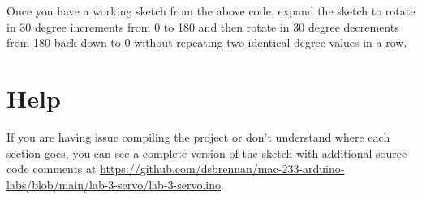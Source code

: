 \documentclass[11pt,a4paper]{article}
\begin{document}
\noindent
Once you have a working sketch from the above code, expand the sketch to rotate in 30 degree increments from 0 to 180 and then rotate in 30 degree decrements from 180 back down to 0 without repeating two identical degree values in a row.

\section*{Help}
If you are having issue compiling the project or don't understand where each section goes, you can see a complete version of the sketch with additional source code comments at \url{https://github.com/dsbrennan/mac-233-arduino-labs/blob/main/lab-3-servo/lab-3-servo.ino}.

\vspace{2em}

\begin{center}
\end{center}
\end{document}
